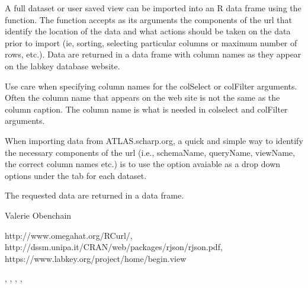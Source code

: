 \documentclass{article}
\begin{document}
\begin{Details}\relax
A full dataset or user saved view can be imported into an R data frame using the  
function. The function accepts as its arguments the components of the url that identify
the location of the data and what actions should be taken on the data prior to import
(ie, sorting, selecting particular columns or maximum number of rows, etc.). Data are returned in a data 
frame with column names as they appear on the labkey database website. 

Use care when specifying column names for the colSelect or colFilter arguments. Often the column name
that appears on the web site is not the same as the column caption. The column name is what is needed in
colselect and colFilter arguments. 

When importing data from ATLAS.scharp.org, a quick and simple way to identify the necessary components of the url 
(i.e., schemaName, queryName, viewName, the correct column names etc.) is to use the 
option avaiable as a drop down options under the  tab for each dataset.
\end{Details}
\begin{Value}
The requested data are returned in a data frame.
\end{Value}
\begin{Author}\relax
Valerie Obenchain
\end{Author}
\begin{References}\relax
http://www.omegahat.org/RCurl/,\\ 
http://dssm.unipa.it/CRAN/web/packages/rjson/rjson.pdf,\\
https://www.labkey.org/project/home/begin.view
\end{References}
\begin{SeeAlso}\relax
{}, , , 
, 
\end{SeeAlso}
\end{document}
